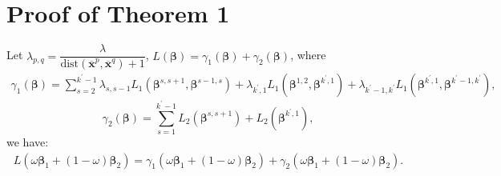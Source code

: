 \documentclass[final,3p,times]{elsarticle}
\begin{document}
\section{Proof of Theorem 1}
Let $\lambda_{p,q}=\dfrac{\lambda}{\text{dist}(\overline
{\boldsymbol{x}}^{p},\overline{\boldsymbol{x}}^{q})+1}$, 
$L(\boldsymbol{\beta})=\gamma_1(\boldsymbol{\beta})+
\gamma_2(\boldsymbol{\beta})$, where
\begin{equation*}
\begin{aligned}
\gamma_1(\boldsymbol{\beta})=\sum\limits_{s=2}^
{k^\prime-1}\lambda_{s,s-1}L_1(\boldsymbol{\beta}^{s,s+1},
\boldsymbol{\beta}^{s-1,s}) +\lambda_{k^\prime,1}L_1
(\boldsymbol{\beta}^{1,2},\boldsymbol{\beta}^{k^\prime,1}) +\lambda_{k^\prime-1,k^\prime}L_1(\boldsymbol{\beta}^{k^\prime,1},
  \boldsymbol{\beta}^{k^\prime-1,k^\prime}),
\end{aligned}
\end{equation*}
\begin{equation*}
\gamma_2(\boldsymbol{\beta})=\sum\limits_{s=1}^
{k^\prime-1}L_2(\boldsymbol{\beta}^{s,s+1})+
L_2(\boldsymbol{\beta}^{k^\prime,1}),
\end{equation*}
we have: 
\begin{equation*}
\begin{aligned}
L(\omega\boldsymbol{\beta}_1+(1-\omega)\boldsymbol{\beta}_2)=\gamma_1(\omega\boldsymbol{\beta}_1+(1-\omega)\boldsymbol
{\beta}_2)+\gamma_2(\omega\boldsymbol{\beta}_1+(1-\omega)
\boldsymbol{\beta}_2).
\end{aligned}
\end{equation*}
\end{document}
